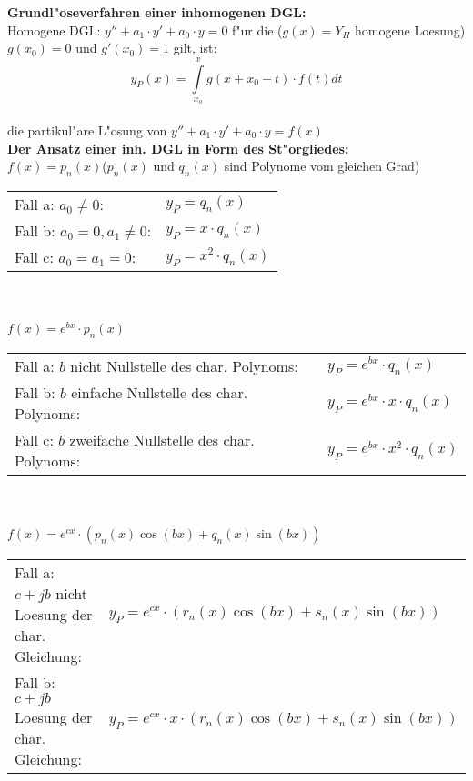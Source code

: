 	\textbf{Grundl"oseverfahren einer inhomogenen DGL:\quad{}}\\
	Homogene DGL: $y''+a_1\cdot y'+a_0\cdot y=0$  f"ur die ($g(x)=Y_H$ homogene Loesung)  $g(x_0)=0$  und
	$g'(x_0)=1$  gilt, ist:\\
	$$y_P(x)=\int\limits_{x_o}^{x} g(x+x_0-t)\cdot f(t)dt$$\\
	die partikul"are L"osung von $y''+a_1\cdot y'+a_0\cdot y=f(x)$\\
	
	\textbf{Der Ansatz einer inh. DGL in Form des
	St"orgliedes:\quad{}}\\
	
	 $f(x)=p_n(x)$\hspace{9cm}($p_n(x)$
	und $q_n(x)$ sind Polynome vom gleichen Grad)\\
	\begin{tabular}{p{8cm}p{4cm}}
	Fall a: $a_0\neq 0$:          & $y_P = q_n(x)$\\
	Fall b: $a_0 = 0 , a_1\neq 0$:& $y_P=x\cdot q_n(x)$\\
	Fall c: $a_0=a_1=0$:          & $y_P=x^2\cdot q_n(x)$\\
	\end{tabular}\\
	\\
	
	$f(x)=e^{bx}\cdot p_n(x)$\\
	\begin{tabular}{p{8cm}p{4cm}}
	Fall a: $b$ nicht Nullstelle des char. Polynoms:    &
	$y_P=e^{bx}\cdot q_n(x)$\\
	Fall b: $b$ einfache Nullstelle des char. Polynoms: &
	$y_P=e^{bx}\cdot x \cdot q_n(x)$\\
	Fall c: $b$ zweifache Nullstelle des char. Polynoms:&
	$y_P=e^{bx}\cdot x^2\cdot q_n(x)$\\
	\end{tabular}\\
	\\
	
	$f(x)=e^{cx}\cdot (p_n(x)\cos(bx)+q_n(x)\sin(bx))$\\
	\begin{tabular}{p{8cm}p{8cm}}
	Fall a: $c+jb$ nicht Loesung der char. Gleichung:    &
	$y_P=e^{cx}\cdot (r_n(x)\cos(bx)+s_n(x)\sin(bx))$\\
	Fall b: $c+jb$ Loesung der char. Gleichung: &
	$y_P=e^{cx}\cdot x\cdot(r_n(x)\cos(bx)+s_n(x)\sin(bx))$\\
	\end{tabular}\\
	\\

